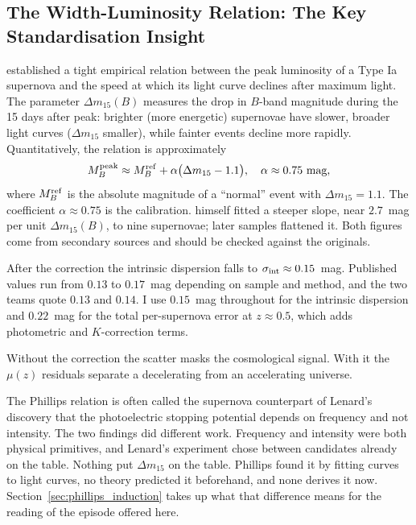 \documentclass[12pt]{article}
\begin{document}
\subsection{The Width-Luminosity Relation: The Key Standardisation Insight}

\citet{Phillips1993} established a tight empirical relation between the
peak luminosity of a Type Ia supernova and the speed at which its light
curve declines after maximum light.  The parameter $\Delta m_{15}(B)$
measures the drop in $B$-band magnitude during the 15 days after peak:
brighter (more energetic) supernovae have slower, broader light curves
($\Delta m_{15}$ smaller), while fainter events decline more rapidly.
Quantitatively, the relation is approximately
\begin{equation}\label{eq:phillips}
  M_B^{\rm peak} \approx M_B^{\rm ref} + \alpha\bigl(\Delta m_{15} - 1.1\bigr),
  \quad \alpha \approx 0.75~\text{mag},
\end{equation}
where $M_B^{\rm ref}$ is the absolute magnitude of a ``normal'' event with
$\Delta m_{15} = 1.1$.  The coefficient $\alpha \approx 0.75$ is the
\citet{Hamuy1996} calibration.  \citet{Phillips1993} himself fitted a
steeper slope, near $2.7$~mag per unit $\Delta m_{15}(B)$, to nine
supernovae; later samples flattened it.  Both figures come from secondary
sources and should be checked against the originals.

After the correction the intrinsic dispersion falls to
$\sigma_{\rm int} \approx 0.15$~mag.  Published values run from $0.13$ to
$0.17$~mag depending on sample and method, and the two teams quote $0.13$ and
$0.14$.  I use $0.15$~mag throughout for the intrinsic dispersion and
$0.22$~mag for the total per-supernova error at $z \approx 0.5$, which adds
photometric and $K$-correction terms.

Without the correction the scatter masks the cosmological signal.  With it
the $\mu(z)$ residuals separate a decelerating from an accelerating universe.

The Phillips relation is often called the supernova counterpart of Lenard's
discovery that the photoelectric stopping potential depends on frequency and
not intensity.  The two findings did different work.  Frequency and intensity
were both physical primitives, and Lenard's experiment chose between
candidates already on the table.  Nothing put $\Delta m_{15}$ on the table.
Phillips found it by fitting curves to light curves, no theory predicted it
beforehand, and none derives it now.  Section~\ref{sec:phillips_induction}
takes up what that difference means for the reading of the episode offered
here.
\end{document}
